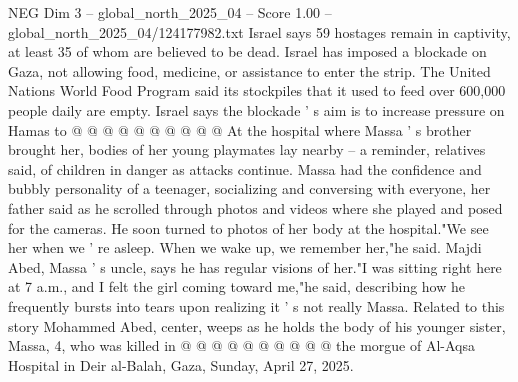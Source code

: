 \begin{textsample}{NEG Dim 3 – global\_north\_2025\_04 – Score 1.00 – global\_north\_2025\_04/124177982.txt}
Israel says 59 hostages remain in captivity, at least 35 of whom are believed to be dead.
Israel has imposed a blockade on Gaza, not allowing food, medicine, or assistance to enter the strip.
The United Nations World Food Program said its stockpiles that it used to feed over 600,000 people daily are empty.
Israel says the blockade ' s aim is to increase pressure on Hamas to @ @ @ @ @ @ @ @ @ @ At the hospital where Massa ' s brother brought her, bodies of her young playmates lay nearby -- a reminder, relatives said, of children in danger as attacks continue.
Massa had the confidence and bubbly personality of a teenager, socializing and conversing with everyone, her father said as he scrolled through photos and videos where she played and posed for the cameras.
He soon turned to photos of her body at the hospital."We see her when we ' re asleep.
When we wake up, we remember her,"he said.
Majdi Abed, Massa ' s uncle, says he has regular visions of her."I was sitting right here at 7 a.m., and I felt the girl coming toward me,"he said, describing how he frequently bursts into tears upon realizing it ' s not really Massa.
Related to this story Mohammed Abed, center, weeps as he holds the body of his younger sister, Massa, 4, who was killed in @ @ @ @ @ @ @ @ @ @ the morgue of Al-Aqsa Hospital in Deir al-Balah, Gaza, Sunday, April 27, 2025.

\end{textsample}
